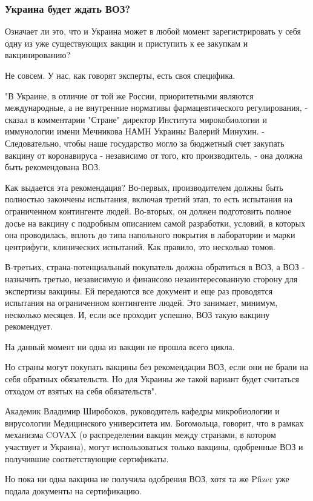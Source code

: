 \subsubsection{Украина будет ждать ВОЗ?}

Означает ли это, что и Украина может в любой момент зарегистрировать у себя
одну из уже существующих вакцин и приступить к ее закупкам и вакцинированию?

Не совсем. У нас, как говорят эксперты, есть своя специфика.

"В Украине, в отличие от той же России, приоритетными являются международные, а
не внутренние нормативы фармацевтического регулирования, - сказал в комментарии
"Стране" директор Института мирокобиологии и иммунологии имени Мечникова НАМН
Украины Валерий Минухин. - Следовательно, чтобы наше государство могло за
бюджетный счет закупать вакцину от коронавируса - независимо от того, кто
производитель, - она должна быть рекомендована ВОЗ.

Как выдается эта рекомендация? Во-первых, производителем должны быть полностью
закончены испытания, включая третий этап, то есть испытания на ограниченном
контингенте людей. Во-вторых, он должен подготовить полное досье на вакцину с
подробным описанием самой разработки, условий, в которых она проводилась,
вплоть до типа напольного покрытия в лаборатории и марки центрифуги,
клинических испытаний. Как правило, это несколько томов. 

В-третьих, страна-потенциальный покупатель должна обратиться в ВОЗ, а ВОЗ -
назначить третью, независимую и финансово незаинтересованную сторону для
экспертизы вакцины. Ей передаются все документ и еще раз проводятся испытания
на ограниченном контингенте людей. Это занимает, минимум, несколько месяцев. И,
если все проходит успешно, ВОЗ такую вакцину рекомендует.

На данный момент ни одна из вакцин не прошла всего цикла.

Но страны могут покупать вакцины без рекомендации ВОЗ, если они не брали на
себя обратных обязательств. Но для Украины же такой вариант будет считаться
отходом от взятых на себя обязательств".

Академик Владимир Широбоков, руководитель кафедры микробиологии и вирусологии
Медицинского университета им. Богомольца, говорит, что в рамках механизма COVAX
(о распределении вакцин между странами, в котором участвует и Украина), могут
использоваться только вакцины, одобренные ВОЗ и получившие соответствующие
сертификаты.

Но пока ни одна вакцина не получила одобрения ВОЗ, хотя та же Pfizer уже подала
документы на сертификацию. 

